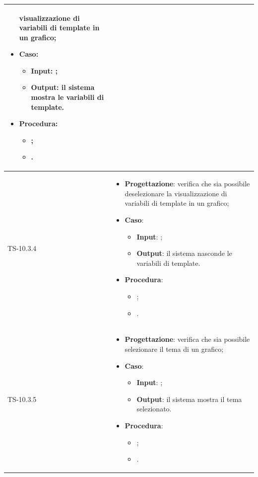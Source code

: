 \begin{longtable}{|C{2.5cm}|C{13cm}|}
\begin{itemize}
	visualizzazione di variabili di template in un grafico;
	\item \textbf{Caso}: 
	\begin{itemize}
		\item \textbf{Input}: ;
		\item \textbf{Output}: il sistema mostra le variabili di template.
	\end{itemize}
	\item \textbf{Procedura}:
	\begin{itemize}
		\item ;
		\item .
	\end{itemize} 
\end{itemize}
	  \\
	\hline
	{TS-10.3.4} &
\begin{itemize}
	\item \textbf{Progettazione}: verifica che sia  possibile deselezionare la
	visualizzazione di variabili di template in un grafico;
	\item \textbf{Caso}: 
	\begin{itemize}
		\item \textbf{Input}: ;
		\item \textbf{Output}: il sistema nasconde le variabili di template.
	\end{itemize}
	\item \textbf{Procedura}:
	\begin{itemize}
		\item ;
		\item .
	\end{itemize} 
\end{itemize}
	  \\
	\hline
	{TS-10.3.5} &
\begin{itemize}
	\item \textbf{Progettazione}: verifica che sia possibile selezionare il
	tema di un grafico;
	\item \textbf{Caso}: 
	\begin{itemize}
		\item \textbf{Input}: ;
		\item \textbf{Output}: il sistema mostra il tema selezionato.
	\end{itemize}
	\item \textbf{Procedura}:
	\begin{itemize}
		\item ;
		\item .
	\end{itemize} 

\end{itemize}
\end{longtable}

